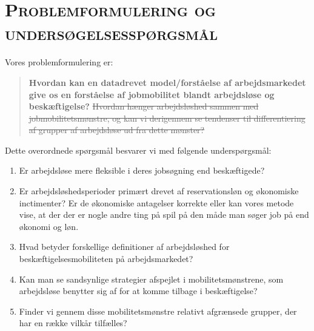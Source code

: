 \section{\textsc{Problemformulering og undersøgelsesspørgsmål}}


Vores problemformulering er:
\begin{quote} %
  \textbf{Hvordan kan en datadrevet model/forståelse af arbejdsmarkedet give os en forståelse af jobmobilitet blandt arbejdsløse og beskæftigelse?} \sout{Hvordan hænger arbejdsløshed sammen med jobmobilitetsmønstre, og kan vi derigennem se tendenser til differentiering af grupper af arbejdsløse ud fra dette mønster?}%
\end{quote}
%
Dette overordnede spørgsmål besvarer vi med følgende underspørgsmål:
%
 \begin{enumerate} [topsep=6pt,itemsep=-1ex]
   \item Er arbejdsløse mere fleksible i deres jobsøgning end beskæftigede?
   \item Er arbejdsløshedsperioder primært drevet af reservationsløn og økonomiske inctimenter? Er de økonomiske antagelser korrekte eller kan vores metode vise, at der der er nogle andre ting på spil på den måde man søger job på end økonomi og løn.
   \item Hvad betyder forskellige definitioner af arbejdsløshed for beskæftigelsesmobiliteten på arbejdsmarkedet?
   \item Kan man se sandsynlige strategier afspejlet i mobilitetsmønstrene, som arbejdsløse benytter sig af for at komme tilbage i beskæftigelse?
   \item Finder vi gennem disse mobilitetsmønstre relativt afgrænsede grupper, der har en række vilkår tilfælles?
 \end{enumerate}
% 



